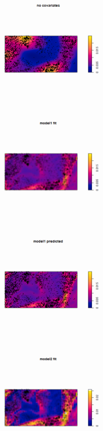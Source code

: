 \documentclass{article}
\begin{document}
\begin{figure}[h]
    \centering
    \includegraphics[width=6cm]{prob3_intensity_nocovariates.png} \\
    \includegraphics[width=6cm]{prob3_model1_fit.png}
    \includegraphics[width=6cm]{prob3_model1_predict.png} \\
    \includegraphics[width=6cm]{prob3_model2_fit.png}

\end{figure}
\end{document}
